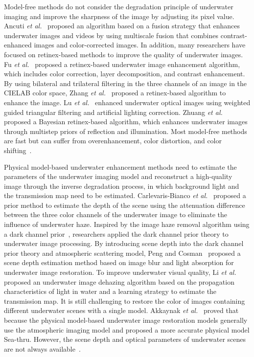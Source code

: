 \documentclass[utf8]{FrontiersinHarvard} %
\begin{document}
Model-free methods do not consider the degradation principle of underwater imaging and improve the sharpness of the image by adjusting its pixel value. Ancuti \textit{et al.}~\citep{2012Enhancing} proposed an algorithm based on a fusion strategy that enhances underwater images and videos by using multiscale fusion that combines contrast-enhanced images and color-corrected images. In addition, many researchers have focused on retinex-based methods to improve the quality of underwater images. Fu \textit{et al.}~\citep{2015A} proposed a retinex-based underwater image enhancement algorithm, which includes color correction, layer decomposition, and contrast enhancement. By using bilateral and trilateral filtering in the three channels of an image in the CIELAB color space, Zhang \textit{et al.}~\citep{ZHANG20171} proposed a retinex-based algorithm to enhance the image. Lu \textit{et al.}~\citep{2016Underwater} enhanced underwater optical images using weighted guided triangular filtering and artificial lighting correction. Zhuang \textit{et al.}~\citep{zhuang2021bayesian} proposed a Bayesian retinex-based algorithm, which enhances underwater images through multistep priors of reflection and illumination. Most model-free methods are fast but can suffer from overenhancement, color distortion, and color shifting~\citep{lu2017underwater}.

Physical model-based underwater enhancement methods need to estimate the parameters of the underwater imaging model and reconstruct a high-quality image through the inverse degradation process, in which background light and the transmission map need to be estimated. Carlevaris-Bianco \textit{et al.}~\citep{2010Initial} proposed a prior method to estimate the depth of the scene using the attenuation difference between the three color channels of the underwater image to eliminate the influence of underwater haze. Inspired by the image haze removal algorithm using a dark channel prior~\citep{2011Single}, researchers applied the dark channel prior theory to underwater image processing. By introducing scene depth into the dark channel prior theory and atmospheric scattering model, Peng and Cosman~\citep{7840002} proposed a scene depth estimation method based on image blur and light absorption for underwater image restoration. To improve underwater visual quality, Li \textit{et al.}~\citep{LI201762} proposed an underwater image dehazing algorithm based on the propagation characteristics of light in water and a learning strategy to estimate the transmission map. {It is still challenging to restore the color of images containing different underwater scenes with a single model. Akkaynak \textit{et al.}~\citep{akkaynak2019sea} proved that because the physical model-based underwater image restoration models generally use the atmospheric imaging model and proposed a more accurate physical model Sea-thru.} However, the scene depth and optical parameters of underwater scenes are not always available~\citep{9001231}.
\end{document}
